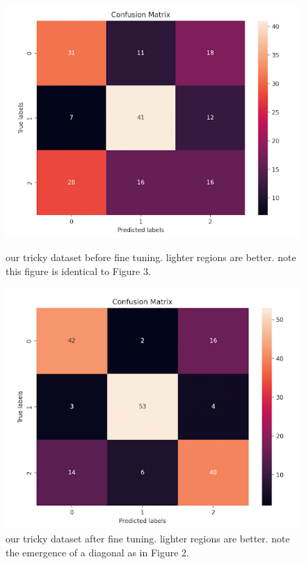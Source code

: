 \documentclass{article}
\begin{document}
\begin{figure}[!h]
	\centering
	\begin{minipage}{0.45\textwidth}
		\includegraphics[width=\linewidth]{images/confusion_trained_tricky.png}
		\caption{our tricky dataset before fine tuning. lighter regions are better. note this figure is identical to Figure 3.}
	\end{minipage}
	\hfill
	\begin{minipage}{0.45\textwidth}
		\includegraphics[width=\linewidth]{images/confusion_tuned_tricky.png}
		\caption{our tricky dataset after fine tuning. lighter regions are better. note the emergence of a diagonal as in Figure 2.}
	\end{minipage}
\end{figure}
\end{document}
